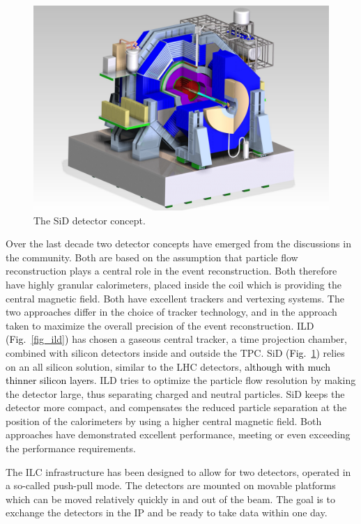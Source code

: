 \documentclass[%
 reprint,
 amsmath,amssymb,
 aps,
]{revtex4-1}
\newcommand{\jim}[1]{\textcolor{black}{#1}}
\def\Fig#1{Fig.~\ref{#1}}
\begin{document}
\begin{figure}[tb]
 \begin{center}
 \includegraphics[width=\hsize]{figures/SiD.pdf}
\caption{The SiD detector concept.
\label{fig_sid}}
 \end{center}
 \end{figure}


Over the last decade two detector concepts have emerged from the discussions in the community. Both are based on the assumption that particle flow reconstruction plays a central role in the event reconstruction. Both therefore have highly granular calorimeters, placed inside the coil which is providing the central magnetic field. Both have excellent trackers and vertexing systems. The two approaches differ in the choice of tracker technology, and in the approach taken to maximize the overall precision of the event reconstruction. ILD \jim{(\Fig{fig_ild}) } has chosen a gaseous central tracker, a time projection chamber, combined with silicon detectors inside and outside the TPC. SiD \jim{(\Fig{fig_sid}) } relies on an all silicon solution, similar to the LHC detectors, \jim{although with
much thinner silicon layers}. ILD tries to optimize the particle flow resolution by making the detector large, thus separating charged and neutral particles. SiD keeps the detector more compact, and compensates the reduced particle separation at the position of the calorimeters by using a higher central magnetic field. Both approaches have demonstrated excellent performance, meeting or even exceeding the performance requirements. 

The ILC infrastructure has been designed to allow for two detectors, operated in a so-called push-pull mode. The detectors are mounted on movable platforms which can be moved relatively quickly in and out of the beam. The goal is to exchange the detectors in the IP and be ready to take data within one day. 
\end{document}
